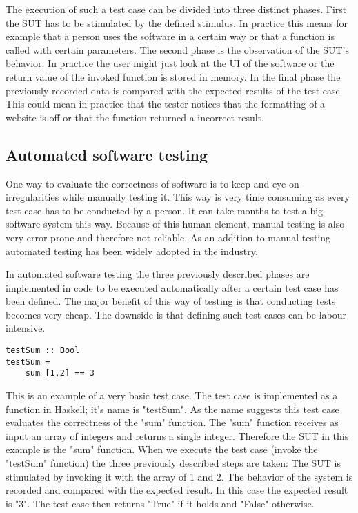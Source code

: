 \documentclass[a4paper, 12pt]{article} %
\begin{document}
The execution of such a test case can be divided into three distinct phases. First the SUT has to be stimulated by the defined stimulus. In practice this means for example that a person uses the software in a certain way or that a function is called with certain parameters. The second phase is the observation of the SUT's behavior. In practice the user might just look at the UI of the software or the return value of the invoked function is stored in memory. In the final phase the previously recorded data is compared with the expected results of the test case. This could mean in practice that the tester notices that the formatting of a website is off or that the function returned a incorrect result.

\subsection{Automated software testing}

One way to evaluate the correctness of software is to keep and eye on irregularities while manually testing it. This way is very time consuming as every test case has to be conducted by a person. It can take months to test a big software system this way. \cite{Arts06} Because of this human element, manual testing is also very error prone and therefore not reliable. As an addition to manual testing automated testing has been widely adopted in the industry.

In automated software testing the three previously described phases are implemented in code to be executed automatically after a certain test case has been defined. The major benefit of this way of testing is that conducting tests becomes very cheap. The downside is that defining such test cases can be labour intensive.

\begin{verbatim}
testSum :: Bool
testSum = 
    sum [1,2] == 3
\end{verbatim}

This is an example of a very basic test case. The test case is implemented as a function in Haskell; it's name is "testSum". As the name suggests this test case evaluates the correctness of the "sum" function. The "sum" function receives as input an array of integers and returns a single integer. Therefore the SUT in this example is the "sum" function. When we execute the test case (invoke the "testSum" function) the three previously
described steps are taken: The SUT is stimulated by invoking it with the array of 1 and 2. The behavior of the system is recorded and compared with the expected result. In this case the expected result is "3". The test case then returns "True" if it holds and "False" otherwise. 
\end{document}
